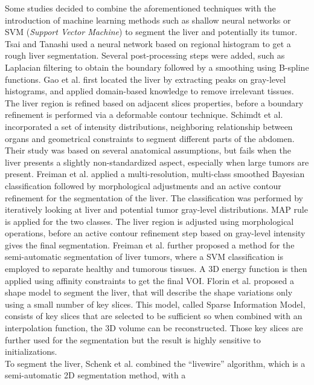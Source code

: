 Some studies decided to combine the aforementioned techniques with the introduction of
machine learning methods such as shallow neural networks or SVM
(\emph{Support Vector Machine}) to segment the liver and potentially its tumor.\\
Tsai and Tanashi \cite{Tsai1994} used a neural network based on regional histogram to get
a rough liver segmentation. Several post-processing steps were added,
such as Laplacian filtering to obtain the boundary followed by a
smoothing using B-spline functions.
Gao et al. \cite{Gao1996} first located the liver by extracting peaks on gray-level
histograms, and applied domain-based knowledge to remove irrelevant
tissues. The liver region is refined based on adjacent slices
properties, before a boundary refinement is performed via a deformable
contour technique.
Schimdt et al. \cite{Schmidt2007} incorporated a set of intensity distributions,
neighboring relationship between organs and geometrical constraints to
segment different parts of the abdomen. Their study was based on several
anatomical assumptions, but fails when the liver presents a slightly
non-standardized aspect, especially when large tumors are present.
Freiman et al. \cite{Freiman2008} applied a multi-resolution, multi-class smoothed Bayesian
classification followed by morphological adjustments and an active
contour refinement for the segmentation of the liver. The classification
was performed by iteratively looking at liver and potential tumor
gray-level distributions. MAP rule is applied for the two classes. The
liver region is adjusted using morphological operations, before an
active contour refinement step based on gray-level intensity gives the
final segmentation.
Freiman et al. \cite{Freiman2011} further proposed a method for the semi-automatic segmentation of
liver tumors, where a SVM classification is employed to separate healthy
and tumorous tissues. A 3D energy function is then applied using
affinity constraints to get the final VOI.
Florin et al. \cite{Florin2007} proposed a shape model to segment the liver, that will describe the shape
variations only using a small number of key slices. This model, called Sparse Information Model, consists of key slices that are selected to be
sufficient so when combined with an interpolation function, the 3D
volume can be reconstructed. Those key slices are further used for the
segmentation but the result is highly sensitive to initializations.\\
To segment the liver, Schenk et al. \cite{Schenk2000} combined the ``livewire'' algorithm, which is a semi-automatic 2D segmentation method, with a
